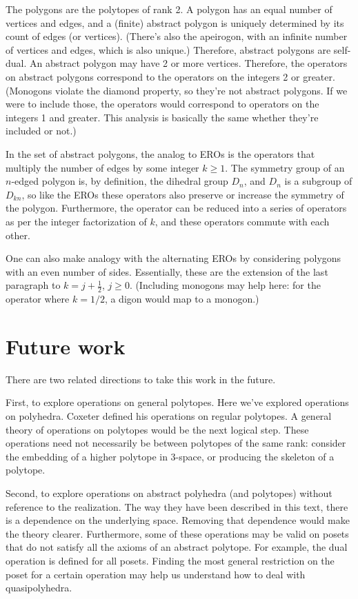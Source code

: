 \documentclass{amsart}[12pt]
\begin{document}
The polygons are the polytopes of rank 2. A polygon has an equal number of
vertices and edges, and a (finite) abstract polygon is uniquely determined by
its count of edges (or vertices). (There's also the apeirogon, with an infinite
number of vertices and edges, which is also unique.) Therefore, abstract
polygons are self-dual. An abstract polygon may have 2 or more vertices.
Therefore, the operators on abstract polygons correspond to the operators on
the integers 2 or greater. (Monogons violate the diamond property, so they're
not abstract polygons. If we were to include those, the operators would
correspond to operators on the integers 1 and greater.
This analysis is basically the same whether they're included or not.)

In the set of abstract polygons, the analog to EROs is the operators that
multiply the number of edges by some integer $k \ge 1$. The symmetry group of
an $n$-edged polygon is, by definition, the dihedral group $D_n$, and $D_n$ is
a subgroup of $D_{kn}$, so like the EROs these operators also preserve or
increase the symmetry of the polygon. Furthermore, the operator can be reduced
into a series of operators as per the integer factorization of $k$, and these
operators commute with each other.

One can also make analogy with the alternating EROs by considering polygons
with an even number of sides. Essentially, these are the extension of the last
paragraph to $k = j + \frac{1}{2}$, $j \ge 0$. (Including monogons may help
here: for the operator where $k=1/2$, a digon would map to a monogon.)

\section{Future work}
There are two related directions to take this work in the future.

First, to explore operations on general polytopes. Here we've explored
operations on polyhedra. Coxeter defined his operations on regular polytopes.
A general theory of operations on polytopes would be the next logical step.
These operations need not necessarily be between polytopes of the same rank:
consider the embedding of a higher polytope in 3-space, or producing the
skeleton of a polytope.

Second, to explore operations on abstract polyhedra (and polytopes) without
reference to the realization. The way they have been described in this text,
there is a dependence on the underlying space. Removing that dependence would
make the theory clearer. Furthermore, some of these operations may be valid on
posets that do not satisfy all the axioms of an abstract polytope. For example,
the dual operation is defined for all posets.
Finding the most general restriction on the poset for a certain operation may
help us understand how to deal with quasipolyhedra.
\end{document}
